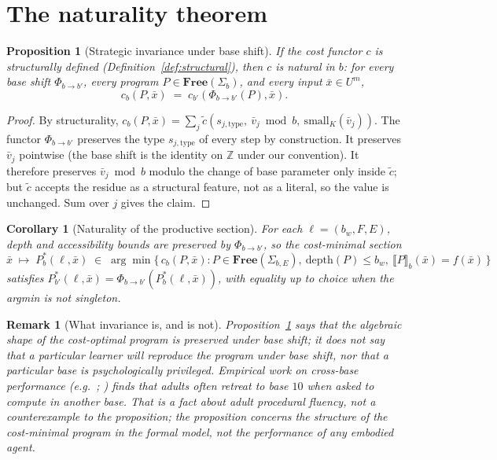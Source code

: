 \documentclass[11pt]{article}
\newtheorem{proposition}{Proposition}
\newtheorem{corollary}{Corollary}
\newtheorem{remark}{Remark}
\begin{document}
\section{The naturality theorem}\label{sec:naturality}

\begin{proposition}[Strategic invariance under base shift]
\label{prop:naturality}
If the cost functor $c$ is structurally defined
(Definition~\ref{def:structural}), then $c$ is natural in $b$: for
every base shift $\Phi_{b \to b'}$, every program $P \in
\mathbf{Free}(\Sigma_b)$, and every input $\bar{x} \in U^m$,
\[
c_b(P, \bar{x}) \;=\; c_{b'}(\Phi_{b \to b'}(P), \bar{x}).
\]
\end{proposition}

\begin{proof}
By structurality, $c_b(P, \bar{x}) = \sum_j \tilde c(s_{j,
\mathrm{type}},\ \bar v_j \bmod b,\ \mathrm{small}_K(\bar v_j))$.
The functor $\Phi_{b \to b'}$ preserves the type
$s_{j,\mathrm{type}}$ of every step by construction. It preserves
$\bar v_j$ pointwise (the base shift is the identity on $\mathbb{Z}$
under our convention). It therefore preserves $\bar v_j \bmod b$
modulo the change of base parameter only inside $\tilde c$; but
$\tilde c$ accepts the residue as a structural feature, not as a
literal, so the value is unchanged. Sum over $j$ gives the claim.
\end{proof}

\begin{corollary}[Naturality of the productive section]
For each $\ell = (b_w, F, E)$, depth and accessibility bounds are
preserved by $\Phi_{b\to b'}$, so the cost-minimal section
\[
\bar{x} \;\longmapsto\; P^*_b(\ell, \bar{x}) \;\in\;
\arg\min \{\,c_b(P, \bar{x}) : P \in \mathbf{Free}(\Sigma_{b,E}),\
\mathrm{depth}(P) \le b_w,\ \llbracket P \rrbracket_b(\bar{x}) = f(\bar{x})\,\}
\]
satisfies $P^*_{b'}(\ell, \bar{x}) = \Phi_{b\to b'}(P^*_b(\ell,
\bar{x}))$, with equality up to choice when the argmin is not
singleton.
\end{corollary}

\begin{remark}[What invariance is, and is not]
Proposition~\ref{prop:naturality} says that the algebraic shape of the
cost-optimal program is preserved under base shift; it does not say
that a particular learner will reproduce the program under base shift,
nor that a particular base is psychologically privileged. Empirical
work on cross-base performance (e.g.\ \citealp{khouryZazkis1994};
\citealp{mcclain2003}) finds that adults often retreat to base $10$
when asked to compute in another base. That is a fact about adult
procedural fluency, not a counterexample to the proposition; the
proposition concerns the structure of the cost-minimal program in the
formal model, not the performance of any embodied agent.
\end{remark}
\end{document}
